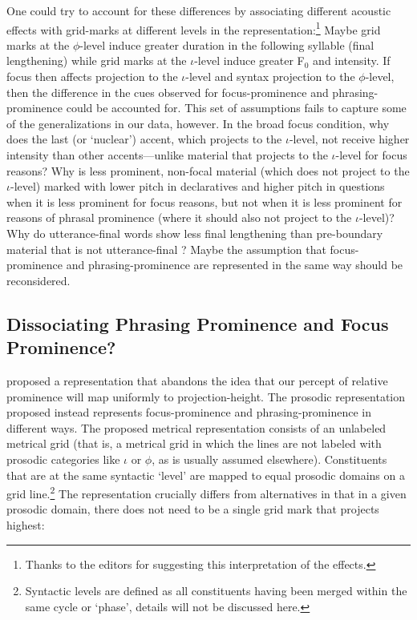 \documentclass[preprint,review,12pt,authoryear,times]{elsarticle}
\begin{document}
One could try to account for these differences by associating different acoustic effects with grid-marks at different levels in the representation:\footnote{Thanks to the editors for suggesting this interpretation of the effects.} Maybe grid marks at the $\phi$-level induce greater duration in the following syllable (final lengthening) while grid marks at the $\iota$-level induce greater F$_0$ and intensity. If focus then affects projection to the $\iota$-level and syntax projection to the $\phi$-level, then the difference in the cues observed for focus-prominence and phrasing-prominence could be accounted for. This set of assumptions fails to capture some of the generalizations in our data, however. In the broad focus condition, why does the last (or `nuclear') accent, which projects to the $\iota$-level, not receive higher intensity than other accents---unlike material that projects to the $\iota$-level for focus reasons? Why is less prominent, non-focal material (which does not project to the $\iota$-level) marked with lower pitch in declaratives and higher pitch in questions when it is less prominent for focus reasons, but not when it is less prominent for reasons of phrasal prominence (where it should also not project to the $\iota$-level)?  Why do utterance-final words show less final lengthening than pre-boundary material that is not utterance-final \citep{wagner05recursion}? Maybe the assumption that focus-prominence and phrasing-prominence are represented in the same way should be reconsidered.


\subsection{Dissociating Phrasing Prominence and Focus Prominence?}

\citet{wagner05recursion} proposed a representation that abandons the idea that our percept of relative prominence will map uniformly to projection-height. The prosodic representation proposed instead represents focus-prominence and phrasing-prominence in different ways. The proposed metrical representation consists of an unlabeled metrical grid (that is, a metrical grid in which the lines are not labeled with prosodic categories like $\iota$ or $\phi$, as is usually assumed elsewhere). Constituents that are at the same syntactic `level'  are mapped to equal prosodic domains on a grid line.\footnote{Syntactic levels are defined as all constituents having been merged within the same cycle or `phase', details will not be discussed here.}  The representation crucially differs from alternatives in that in a given prosodic domain, there does not need to be a single grid mark that projects highest:
\end{document}
